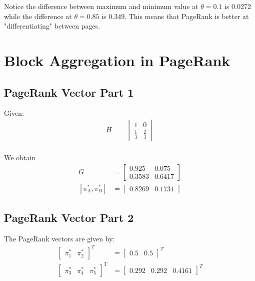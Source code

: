 \documentclass[]{article}
\begin{document}
Notice the difference between maximum and minimum value at $\theta=0.1$ is 0.0272 while the difference at $\theta=0.85$ is 0.349. This means that PageRank is better at "differentiating" between pages.


\newpage
\section{Block Aggregation in PageRank}

\subsection{PageRank Vector Part 1}

Given:
\begin{align*}
	H &= \begin{bmatrix}
	1 & 0 \\
	\frac{1}{3} & \frac{2}{3}
	\end{bmatrix} \\
\end{align*}

We obtain
\begin{align*}
	G &= 
	\begin{bmatrix}
		0.925 & 0.075 \\
		0.3583 & 0.6417
	\end{bmatrix} \\
	[\pi_A^*, \pi_B^* ] &= 
	\begin{bmatrix}
		0.8269 & 0.1731
	\end{bmatrix}
\end{align*}

\subsection{PageRank Vector Part 2}

The PageRank vectors are given by:
\begin{align*}
	\begin{bmatrix}
		\pi_1^* & \pi_2^*
	\end{bmatrix}^T 
	&=
	\begin{bmatrix}
		0.5 & 0.5
	\end{bmatrix}^T 
	\\
	\begin{bmatrix}
		\pi_3^* & \pi_4^* & \pi_5^*
	\end{bmatrix}^T 
	&=
	\begin{bmatrix}
		0.292 & 0.292 & 0.4161
	\end{bmatrix}^T 
\end{align*}
\end{document}
